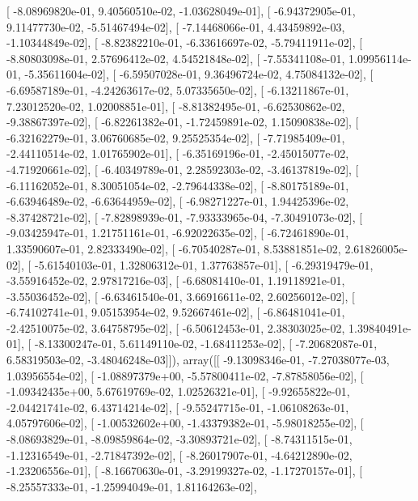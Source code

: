 \documentclass{article}
\begin{document}
       [ -8.08969820e-01,   9.40560510e-02,  -1.03628049e-01],
       [ -6.94372905e-01,   9.11477730e-02,  -5.51467494e-02],
       [ -7.14468066e-01,   4.43459892e-03,  -1.10344849e-02],
       [ -8.82382210e-01,  -6.33616697e-02,  -5.79411911e-02],
       [ -8.80803098e-01,   2.57696412e-02,   4.54521848e-02],
       [ -7.55341108e-01,   1.09956114e-01,  -5.35611604e-02],
       [ -6.59507028e-01,   9.36496724e-02,   4.75084132e-02],
       [ -6.69587189e-01,  -4.24263617e-02,   5.07335650e-02],
       [ -6.13211867e-01,   7.23012520e-02,   1.02008851e-01],
       [ -8.81382495e-01,  -6.62530862e-02,  -9.38867397e-02],
       [ -6.82261382e-01,  -1.72459891e-02,   1.15090838e-02],
       [ -6.32162279e-01,   3.06760685e-02,   9.25525354e-02],
       [ -7.71985409e-01,  -2.44110514e-02,   1.01765902e-01],
       [ -6.35169196e-01,  -2.45015077e-02,  -4.71920661e-02],
       [ -6.40349789e-01,   2.28592303e-02,  -3.46137819e-02],
       [ -6.11162052e-01,   8.30051054e-02,  -2.79644338e-02],
       [ -8.80175189e-01,  -6.63946489e-02,  -6.63644959e-02],
       [ -6.98271227e-01,   1.94425396e-02,  -8.37428721e-02],
       [ -7.82898939e-01,  -7.93333965e-04,  -7.30491073e-02],
       [ -9.03425947e-01,   1.21751161e-01,  -6.92022635e-02],
       [ -6.72461890e-01,   1.33590607e-01,   2.82333490e-02],
       [ -6.70540287e-01,   8.53881851e-02,   2.61826005e-02],
       [ -5.61540103e-01,   1.32806312e-01,   1.37763857e-01],
       [ -6.29319479e-01,  -3.55916452e-02,   2.97817216e-03],
       [ -6.68081410e-01,   1.19118921e-01,  -3.55036452e-02],
       [ -6.63461540e-01,   3.66916611e-02,   2.60256012e-02],
       [ -6.74102741e-01,   9.05153954e-02,   9.52667461e-02],
       [ -6.86481041e-01,  -2.42510075e-02,   3.64758795e-02],
       [ -6.50612453e-01,   2.38303025e-02,   1.39840491e-01],
       [ -8.13300247e-01,   5.61149110e-02,  -1.68411253e-02],
       [ -7.20682087e-01,   6.58319503e-02,  -3.48046248e-03]]), array([[ -9.13098346e-01,  -7.27038077e-03,   1.03956554e-02],
       [ -1.08897379e+00,  -5.57800411e-02,  -7.87858056e-02],
       [ -1.09342435e+00,   5.67619769e-02,   1.02526321e-01],
       [ -9.92655822e-01,  -2.04421741e-02,   6.43714214e-02],
       [ -9.55247715e-01,  -1.06108263e-01,   4.05797606e-02],
       [ -1.00532602e+00,  -1.43379382e-01,  -5.98018255e-02],
       [ -8.08693829e-01,  -8.09859864e-02,  -3.30893721e-02],
       [ -8.74311515e-01,  -1.12316549e-01,  -2.71847392e-02],
       [ -8.26017907e-01,  -4.64212890e-02,  -1.23206556e-01],
       [ -8.16670630e-01,  -3.29199327e-02,  -1.17270157e-01],
       [ -8.25557333e-01,  -1.25994049e-01,   1.81164263e-02],
\end{document}
